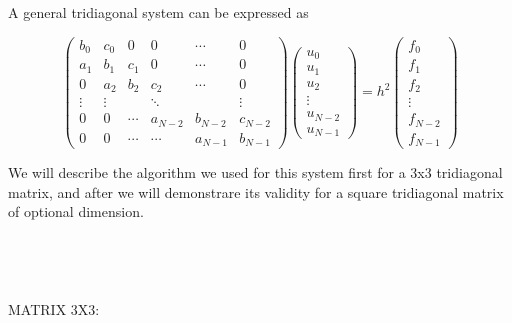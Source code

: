 \documentclass {article}
\begin{document}
A general tridiagonal system can be expressed as

\begin{equation}
 \begin{pmatrix}
   b_0 & c_0 &  0 & 0 & \cdots & 0  \\
  a_1 & b_1 & c_1 & 0 & \cdots & 0  \\
   0 & a_2 &  b_2 & c_2 & \cdots & 0 \\
  \vdots  & \vdots  & & \ddots & & \vdots   \\
   0 &  0 & \cdots  & a_{N-2} & b_{N-2} & c_{N-2} \\
   0 &  0 & \cdots & \cdots  & a_{N-1} & b_{N-1}
 \end{pmatrix}
 \begin{pmatrix}
  u_0 \\
  u_1 \\
  u_2 \\
  \vdots  \\
  u_{N-2} \\
  u_{N-1} 
 \end{pmatrix}
 =h^2
 \begin{pmatrix}
  f_0 \\
  f_1 \\
  f_2 \\
  \vdots  \\
  f_{N-2} \\
  f_{N-1} 
 \end{pmatrix}
\end{equation}

We will describe the algorithm we used for this system first for a 3x3 tridiagonal matrix, and after we will demonstrare its validity for a square tridiagonal matrix of optional dimension.
\\
\\
\\
\\
\\
MATRIX 3X3:
\end{document}
